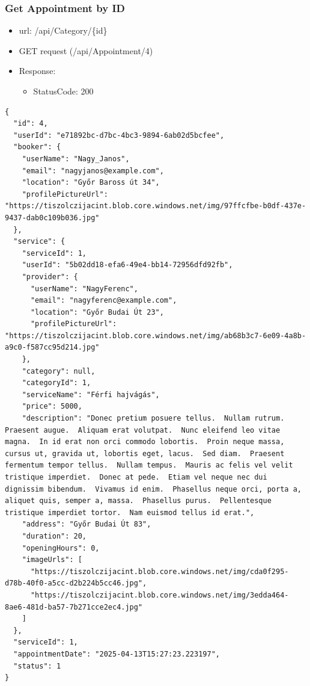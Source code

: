 \documentclass[11pt]{article}
\begin{document}
\subsubsection{Get Appointment by ID}
\label{sec:orge1bc51f}
\begin{itemize}
\item url: /api/Category/\{id\}
\item GET request (/api/Appointment/4)
\item Response:
\begin{itemize}
\item StatusCode: 200
\end{itemize}
\end{itemize}
\begin{verbatim}
{
  "id": 4,
  "userId": "e71892bc-d7bc-4bc3-9894-6ab02d5bcfee",
  "booker": {
    "userName": "Nagy_Janos",
    "email": "nagyjanos@example.com",
    "location": "Győr Baross út 34",
    "profilePictureUrl": "https://tiszolczijacint.blob.core.windows.net/img/97ffcfbe-b0df-437e-9437-dab0c109b036.jpg"
  },
  "service": {
    "serviceId": 1,
    "userId": "5b02dd18-efa6-49e4-bb14-72956dfd92fb",
    "provider": {
      "userName": "NagyFerenc",
      "email": "nagyferenc@example.com",
      "location": "Győr Budai Út 23",
      "profilePictureUrl": "https://tiszolczijacint.blob.core.windows.net/img/ab68b3c7-6e09-4a8b-a9c0-f587cc95d214.jpg"
    },
    "category": null,
    "categoryId": 1,
    "serviceName": "Férfi hajvágás",
    "price": 5000,
    "description": "Donec pretium posuere tellus.  Nullam rutrum.  Praesent augue.  Aliquam erat volutpat.  Nunc eleifend leo vitae magna.  In id erat non orci commodo lobortis.  Proin neque massa, cursus ut, gravida ut, lobortis eget, lacus.  Sed diam.  Praesent fermentum tempor tellus.  Nullam tempus.  Mauris ac felis vel velit tristique imperdiet.  Donec at pede.  Etiam vel neque nec dui dignissim bibendum.  Vivamus id enim.  Phasellus neque orci, porta a, aliquet quis, semper a, massa.  Phasellus purus.  Pellentesque tristique imperdiet tortor.  Nam euismod tellus id erat.",
    "address": "Győr Budai Út 83",
    "duration": 20,
    "openingHours": 0,
    "imageUrls": [
      "https://tiszolczijacint.blob.core.windows.net/img/cda0f295-d78b-40f0-a5cc-d2b224b5cc46.jpg",
      "https://tiszolczijacint.blob.core.windows.net/img/3edda464-8ae6-481d-ba57-7b271cce2ec4.jpg"
    ]
  },
  "serviceId": 1,
  "appointmentDate": "2025-04-13T15:27:23.223197",
  "status": 1
}
\end{verbatim}
\end{document}
